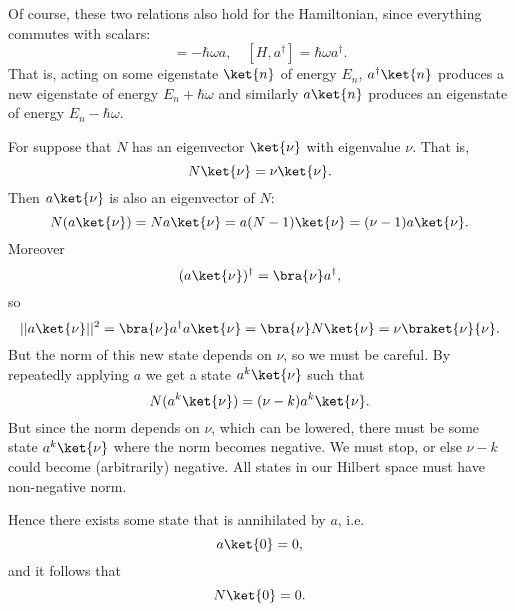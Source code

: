 Of course, these two relations also hold for the Hamiltonian, since everything commutes with scalars:
\begin{equation}
    [H,a] = -\hbar \omega a,\quad [H,a^\dagger] = \hbar \omega a^\dagger.
\end{equation}
That is, acting on some eigenstate $\ket{n}$ of energy $E_n$, $a^\dagger
\ket{n}$ produces a new eigenstate of energy $E_n+\hbar \omega$ and similarly $a\ket{n}$ produces an eigenstate of energy $E_n-\hbar \omega$.

For suppose that $N$ has an eigenvector $\ket{\nu}$ with eigenvalue $\nu$. That is,
\begin{equation}
    N\ket{\nu} = \nu\ket{\nu}.
\end{equation}
Then $a\ket{\nu}$ is also an eigenvector of $N$:
\begin{equation}
    N(a\ket{\nu})=Na\ket{\nu} = a(N-1) \ket{\nu} = (\nu-1)a\ket{\nu}.
\end{equation}
Moreover
\begin{equation}
    (a\ket{\nu})^\dagger = \bra{\nu}a^\dagger,
\end{equation}
so
\begin{equation}
    ||a\ket{\nu}||^2 = \bra{\nu} a^\dagger a \ket{\nu} = \bra{\nu} N \ket{\nu} = \nu \braket{\nu}{\nu}.
\end{equation}
But the norm of this new state depends on $\nu$, so we must be careful. By repeatedly applying $a$ we get a state $a^k\ket{\nu}$ such that
\begin{equation}
    N(a^k\ket{\nu})= (\nu-k) a^k\ket{\nu}.
\end{equation}
But since the norm depends on $\nu$, which can be lowered, there must be some state $a^k\ket{\nu}$ where the norm becomes negative. We must stop, or else $\nu-k$ could become (arbitrarily) negative. All states in our Hilbert space must have non-negative norm. 

Hence there exists some state that is annihilated by $a$, i.e. \begin{equation}
    a\ket{0} = 0,
\end{equation}
and it follows that
\begin{equation}
    N\ket{0}=0.
\end{equation}

